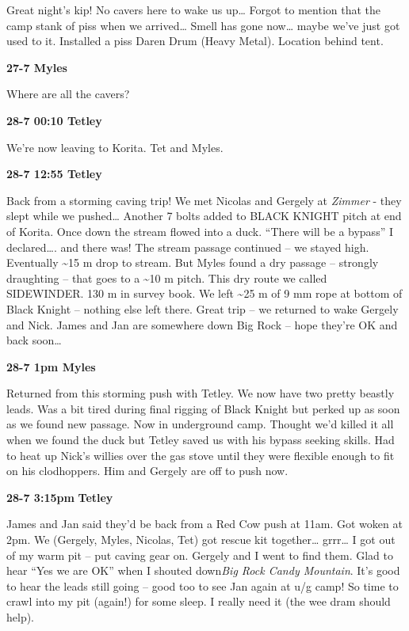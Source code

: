 Great night's kip! No cavers here to wake us up\ldots{} Forgot to
mention that the camp stank of piss when we arrived\ldots{} Smell has
gone now\ldots{} maybe we've just got used to it. Installed a piss Daren
Drum (Heavy Metal). Location behind tent.

\textbf{27-7 Myles}

Where are all the cavers?

\textbf{28-7 00:10 Tetley}

We're now leaving to Korita. Tet and Myles.

\textbf{28-7 12:55 Tetley}

Back from a storming caving trip! We met Nicolas and Gergely at
\emph{Zimmer} - they slept while we pushed\ldots{} Another 7 bolts added
to BLACK KNIGHT pitch at end of Korita. Once down the stream flowed into
a duck. ``There will be a bypass'' I declared\ldots{}. and there was!
The stream passage continued -- we stayed high. Eventually
\textasciitilde 15 m drop to stream. But Myles found a dry passage --
strongly draughting -- that goes to a \textasciitilde 10 m pitch. This
dry route we called SIDEWINDER. 130 m in survey book. We left
\textasciitilde 25 m of 9 mm rope at bottom of Black Knight -- nothing
else left there. Great trip -- we returned to wake Gergely and Nick.
James and Jan are somewhere down Big Rock -- hope they're OK and back
soon\ldots{}

\textbf{28-7 1pm Myles}

Returned from this storming push with Tetley. We now have two pretty
beastly leads. Was a bit tired during final rigging of Black Knight but
perked up as soon as we found new passage. Now in underground camp.
Thought we'd killed it all when we found the duck but Tetley saved us
with his bypass seeking skills. Had to heat up Nick's willies over the
gas stove until they were flexible enough to fit on his clodhoppers. Him
and Gergely are off to push now.

\textbf{28-7 3:15pm} \textbf{Tetley}

James and Jan said they'd be back from a Red Cow push at 11am. Got woken
at 2pm. We (Gergely, Myles, Nicolas, Tet) got rescue kit
together\ldots{} grrr\ldots{} I got out of my warm pit -- put caving
gear on. Gergely and I went to find them. Glad to hear ``Yes we are OK''
when I shouted down\emph{Big Rock Candy Mountain}. It's good to hear the
leads still going -- good too to see Jan again at u/g camp! So time to
crawl into my pit (again!) for some sleep. I really need it (the wee
dram should help).

